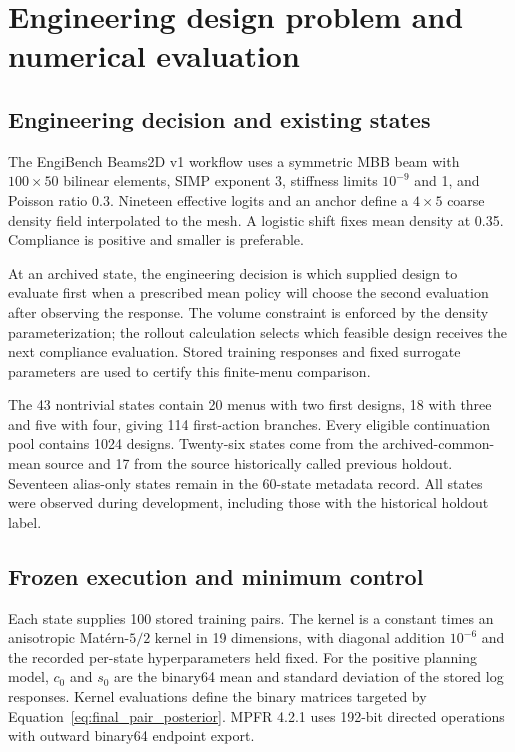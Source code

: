 \section{Engineering design problem and numerical evaluation}\label{sec:lazy_results}

\subsection{Engineering decision and existing states}

The EngiBench Beams2D v1 workflow \citep{ref23} uses a symmetric MBB beam with $100\times50$ bilinear elements, SIMP exponent 3, stiffness limits $10^{-9}$ and 1, and Poisson ratio 0.3. Nineteen effective logits and an anchor define a $4\times5$ coarse density field interpolated to the mesh. A logistic shift fixes mean density at 0.35. Compliance is positive and smaller is preferable.

At an archived state, the engineering decision is which supplied design to evaluate first when a prescribed mean policy will choose the second evaluation after observing the response. The volume constraint is enforced by the density parameterization; the rollout calculation selects which feasible design receives the next compliance evaluation. Stored training responses and fixed surrogate parameters are used to certify this finite-menu comparison.

The 43 nontrivial states contain 20 menus with two first designs, 18 with three and five with four, giving 114 first-action branches. Every eligible continuation pool contains 1024 designs. Twenty-six states come from the archived-common-mean source and 17 from the source historically called previous holdout. Seventeen alias-only states remain in the 60-state metadata record. All states were observed during development, including those with the historical holdout label.

\subsection{Frozen execution and minimum control}

Each state supplies 100 stored training pairs. The kernel is a constant times an anisotropic Mat\'ern-$5/2$ kernel in 19 dimensions, with diagonal addition $10^{-6}$ and the recorded per-state hyperparameters held fixed. For the positive planning model, $c_0$ and $s_0$ are the binary64 mean and standard deviation of the stored log responses. Kernel evaluations define the binary matrices targeted by Equation~\eqref{eq:final_pair_posterior}. MPFR 4.2.1 uses 192-bit directed operations with outward binary64 endpoint export.

